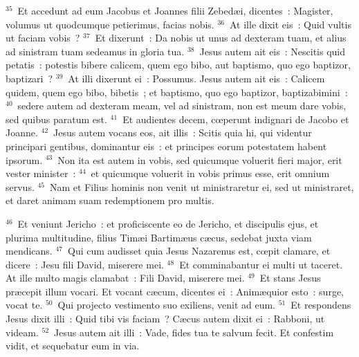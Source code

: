${}^{35}$~Et accedunt ad eum Jacobus et Joannes filii Zebed\ae i, dicentes~: Magister, volumus ut quodcumque petierimus, facias nobis.
${}^{36}$~At ille dixit eis~: Quid vultis ut faciam vobis~?
${}^{37}$~Et dixerunt~: Da nobis ut unus ad dexteram tuam, et alius ad sinistram tuam sedeamus in gloria tua.
${}^{38}$~Jesus autem ait eis~: Nescitis quid petatis~: potestis bibere calicem, quem ego bibo, aut baptismo, quo ego baptizor, baptizari~?
${}^{39}$~At illi dixerunt ei~: Possumus. Jesus autem ait eis~: Calicem quidem, quem ego bibo, bibetis~; et baptismo, quo ego baptizor, baptizabimini~:
${}^{40}$~sedere autem ad dexteram meam, vel ad sinistram, non est meum dare vobis, sed quibus paratum est.
${}^{41}$~Et audientes decem, cœperunt indignari de Jacobo et Joanne.
${}^{42}$~Jesus autem vocans eos, ait illis~: Scitis quia hi, qui videntur principari gentibus, dominantur eis~: et principes eorum potestatem habent ipsorum.
${}^{43}$~Non ita est autem in vobis, sed quicumque voluerit fieri major, erit vester minister~:
${}^{44}$~et quicumque voluerit in vobis primus esse, erit omnium servus.
${}^{45}$~Nam et Filius hominis non venit ut ministraretur ei, sed ut ministraret, et daret animam suam redemptionem pro multis.


${}^{46}$~Et veniunt Jericho~: et proficiscente eo de Jericho, et discipulis ejus, et plurima multitudine, filius Tim\ae i Bartim\ae us c\ae cus, sedebat juxta viam mendicans.
${}^{47}$~Qui cum audisset quia Jesus Nazarenus est, cœpit clamare, et dicere~: Jesu fili David, miserere mei.
${}^{48}$~Et comminabantur ei multi ut taceret. At ille multo magis clamabat~: Fili David, miserere mei.
${}^{49}$~Et stans Jesus pr\ae cepit illum vocari. Et vocant c\ae cum, dicentes ei~: Anim\ae quior esto~: surge, vocat te.
${}^{50}$~Qui projecto vestimento suo exiliens, venit ad eum.
${}^{51}$~Et respondens Jesus dixit illi~: Quid tibi vis faciam~? C\ae cus autem dixit ei~: Rabboni, ut videam.
${}^{52}$~Jesus autem ait illi~: Vade, fides tua te salvum fecit. Et confestim vidit, et sequebatur eum in via.

